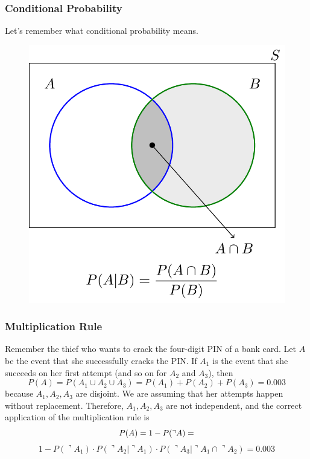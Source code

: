 \documentclass[xcolor=dvipsnames]{beamer}
\begin{document}
\begin{frame}
  \frametitle{Conditional Probability}
Let's remember what conditional probability means.
\begin{figure}[h]
\includegraphics[scale=.25]{./diagrams/conditional_b.png}
\end{figure}
\end{frame}

\begin{frame}
  \frametitle{Multiplication Rule}
  Remember the thief who wants to crack the four-digit PIN of a bank
  card. Let $A$ be the event that she successfully cracks the PIN. If
  $A_{1}$ is the event that she succeeds on her first attempt (and so
  on for $A_{2}$ and $A_{3}$), then
\begin{equation}
  \label{eq:ragheidu}
  P(A)=P(A_{1}\cup{}A_{2}\cup{}A_{3})=P(A_{1})+P(A_{2})+P(A_{3})=0.003
\end{equation}
because $A_{1},A_{2},A_{3}$ are disjoint. We are assuming that her
attempts happen \alert{without replacement}. Therefore,
$A_{1},A_{2},A_{3}$ are not independent, and the correct application of
the multiplication rule is
\begin{equation}
  \label{eq:mohghunu}
  P(A)=1-P(\urcorner{}A)=\notag
\end{equation}
\begin{equation}
  \label{eq:yoobaegh}
  1-P(\urcorner{}A_{1})\cdot{}P(\urcorner{}A_{2}|\urcorner{}A_{1})\cdot{}P(\urcorner{}A_{3}|\urcorner{}A_{1}\cap{}\urcorner{}A_{2})=0.003
\end{equation}
\end{frame}
\end{document}
